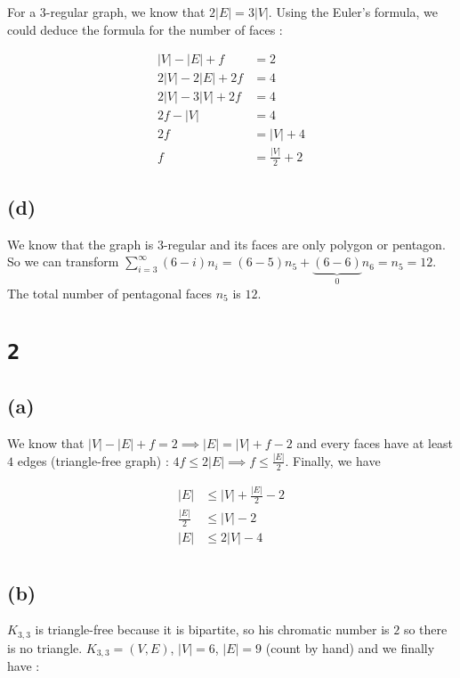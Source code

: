 \documentclass[a4paper,11pt]{report}
\begin{document}
For a $3$-regular graph, we know that $2|E| = 3|V|$. Using the Euler's formula,
we could deduce the  formula for the number of faces :

\begin{align*}
  |V| - |E| + f &= 2 \\
  2|V| - 2|E| + 2f &= 4 \\
  2|V| - 3|V| + 2f &= 4 \\
  2f - |V| &= 4 \\
  2f &= |V| + 4 \\
  f &=  \frac{|V|}{2} + 2
\end{align*}

\subsection*{(d)}

We know that the graph is $3$-regular and its faces are only polygon or
pentagon. So we can transform $\sum_{i=3}^\infty (6-i)n_i = (6-5)n_5 +
\underbrace{(6-6)}_0n_6 = n_5 = 12$. The total number of pentagonal faces $n_5$
is $12$.

\section*{\texttt{2}}

\subsection*{(a)}

We know that $|V| - |E| + f = 2 \implies |E| = |V| + f - 2$ and every faces have
at least $4$ edges (triangle-free graph) : $4f \leq 2|E| \implies f \leq
\frac{|E|}{2}$. Finally, we have

\begin{align*}
  |E| &\leq |V| + \frac{|E|}{2} - 2\\
  \frac{|E|}{2} &\leq |V| - 2\\
  |E| &\leq 2|V| - 4\\
\end{align*}

\subsection*{(b)}

$K_{3,3}$ is triangle-free because it is bipartite, so his chromatic number is
$2$ so there is no triangle. $K_{3,3} = (V,E)$, $|V| = 6$, $|E| = 9$ (count by
hand) and we finally have :
\end{document}
